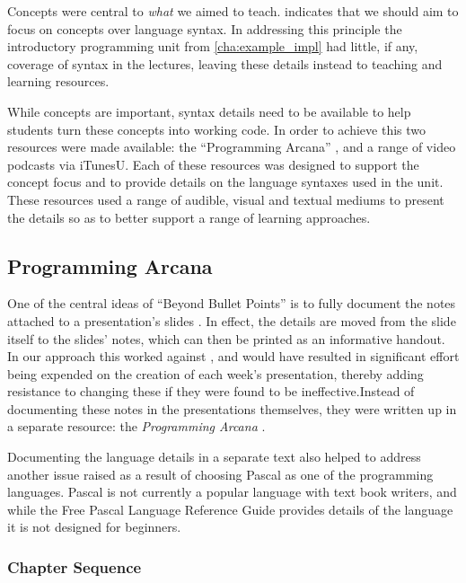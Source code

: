Concepts were central to \emph{what} we aimed to teach.  indicates that we should aim to focus on concepts over language syntax. In addressing this principle the introductory programming unit from \cref{cha:example_impl} had little, if any, coverage of syntax in the lectures, leaving these details instead to teaching and learning resources.

While concepts are important, syntax details need to be available to help students turn these concepts into working code. In order to achieve this two resources were made available: the ``Programming Arcana'' \cite{Cain:2013arcana}, and a range of video podcasts via iTunesU. Each of these resources was designed to support the concept focus and to provide details on the language syntaxes used in the unit. These resources used a range of audible, visual and textual mediums to present the details so as to better support a range of learning approaches.


\subsection{Programming Arcana} %
\label{sub:programming_arcana}

One of the central ideas of ``Beyond Bullet Points'' is to fully document the notes attached to a presentation's slides \cite{Atkinson:2007}. In effect, the details are moved from the slide itself to the slides' notes, which can then be printed as an informative handout. In our approach this worked against , and would have resulted in significant effort being expended on the creation of each week's presentation, thereby adding resistance to changing these if they were found to be ineffective.Instead of documenting these notes in the presentations themselves, they were written up in a separate resource: the \emph{Programming Arcana} \cite{Cain:2013arcana}.

Documenting the language details in a separate text also helped to address another issue raised as a result of choosing Pascal as one of the programming languages. Pascal is not currently a popular language with text book writers, and while the Free Pascal Language Reference Guide \cite{FPC:2013lang} provides details of the language it is not designed for beginners.


\subsubsection{Chapter Sequence} %
\label{ssub:chapter_sequence}

